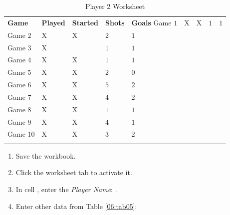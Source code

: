 \begin{table}[H]
	{\small
		\begin{longtable}{L{0.65in}C{0.45in}C{0.50in}C{0.40in}C{0.40in}} %
			\textbf{Game} & \textbf{Played} & \textbf{Started} & \textbf{Shots} & \textbf{Goals}\endhead
			\hline
			Game $ 1 $  & X & X & $ 1 $ & $ 1 $ \\
			Game $ 2 $  & X & X & $ 2 $ & $ 1 $ \\
			Game $ 3 $  & X &   & $ 1 $ & $ 1 $ \\
			Game $ 4 $  & X & X & $ 1 $ & $ 1 $ \\
			Game $ 5 $  & X & X & $ 2 $ & $ 0 $ \\
			Game $ 6 $  & X & X & $ 5 $ & $ 2 $ \\
			Game $ 7 $  & X & X & $ 4 $ & $ 2 $ \\
			Game $ 8 $  & X & X & $ 1 $ & $ 1 $ \\
			Game $ 9 $  & X & X & $ 4 $ & $ 1 $ \\
			Game $ 10 $ & X & X & $ 3 $ & $ 2 $ \\
			\caption{Player 2 Worksheet}
			\label{06:tab04}
		\end{longtable}
	}
\end{table}

\begin{enumbox}
	\begin{enumerate}
		\item Save the  workbook.
		
		\item Click the  worksheet tab to activate it. 
		\item In cell , enter the \textit{Player Name}: . 
		\item Enter other data from Table \ref{06:tab05}:
	\end{enumerate}
\end{enumbox}
	
